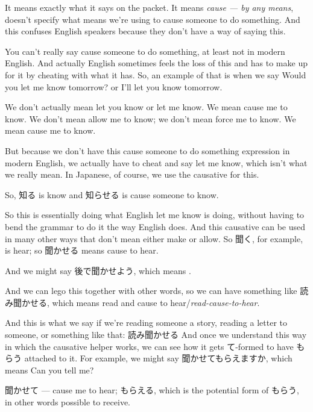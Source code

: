 It means exactly what it says on the packet. It means {\em cause --- by any means}, doesn't specify what means we're using to cause someone to do something. And this confuses English speakers because they don't have a way of saying this.

You can't really say cause someone to do something, at least not in modern English. And actually English sometimes feels the loss of this and has to make up for it by cheating with what it has. So, an example of that is when we say Would you let me know tomorrow? or I'll let you know tomorrow.

We don't actually mean let you know or let me know. We mean cause me to know. We don't mean allow me to know; we don't mean force me to know. We mean cause me to know.

But because we don't have this cause someone to do something expression in modern English, we actually have to cheat and say let me know, which isn't what we really mean. In Japanese, of course, we use the causative for this.

So, 知る is know and 知らせる is cause someone to know.

{}

So this is essentially doing what English let me know is doing, without having to bend the grammar to do it the way English does. And this causative can be used in many other ways that don't mean either make or allow. So 聞く, for example, is hear; so 聞かせる means cause to hear.

And we might say 後で聞かせよう, which means .

{}

And we can lego this together with other words, so we can have something like 読み聞かせる, which means read and cause to hear/{\em read-cause-to-hear}.

{}

And this is what we say if we're reading someone a story, reading a letter to someone, or something like that: 読み聞かせる And once we understand this way in which the causative helper works, we can see how it gets て-formed to have もらう attached to it. For example, we might say 聞かせてもらえますか, which means Can you tell me?

聞かせて --- cause me to hear; もらえる, which is the potential form of もらう, in other words possible to receive.

